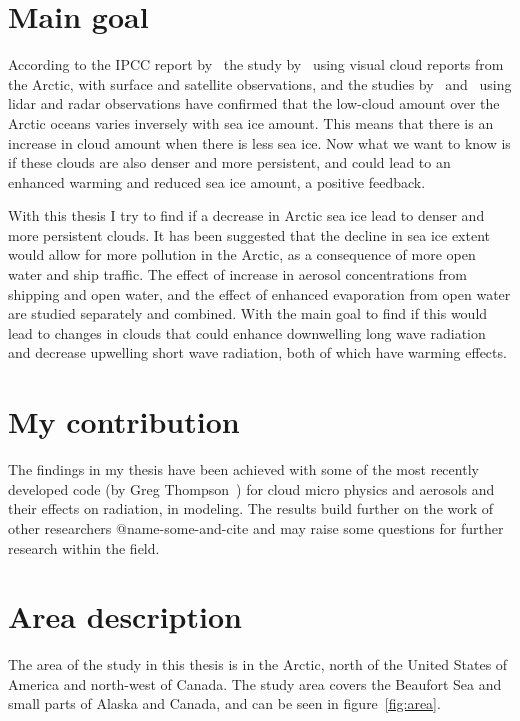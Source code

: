 \section{Main goal}
According to the IPCC report by~\citet{Boucher2013} the study by~\citet{Eastman2010b} using visual cloud reports from the Arctic, with surface and satellite observations, and the studies by~\citet{Kay2009} and~\citet{Palm2010} using lidar and radar observations have confirmed that the low-cloud amount over the Arctic oceans varies inversely with sea ice amount. This means that there is an increase in cloud amount when there is less sea ice. Now what we want to know is if these clouds are also denser and more persistent, and could lead to an enhanced warming and reduced sea ice amount, a positive feedback.

With this thesis I try to find if a decrease in Arctic sea ice lead to denser and more persistent clouds. It has been suggested that the decline in sea ice extent would allow for more pollution in the Arctic, as a consequence of more open water and ship traffic. The effect of increase in aerosol concentrations from shipping and open water, and the effect of enhanced evaporation from open water are studied separately and combined. With the main goal to find if this would lead to changes in clouds that could enhance downwelling long wave radiation and decrease upwelling short wave radiation, both of which have warming effects.


\section{My contribution}
The findings in my thesis have been achieved with some of the most recently developed code (by Greg Thompson~\citep{Thompson2014}) for cloud micro physics and aerosols and their effects on radiation, in modeling. The results build further on the work of other researchers @name-some-and-cite and may raise some questions for further research within the field.

\section{Area description}
The area of the study in this thesis is in the Arctic, north of the United States of America and north-west of Canada. The study area covers the Beaufort Sea and small parts of Alaska and Canada, and can be seen in figure~\ref{fig:area}.

